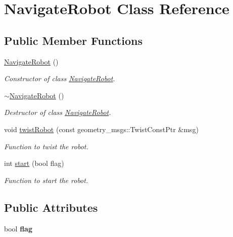 \hypertarget{class_navigate_robot}{}\section{Navigate\+Robot Class Reference}
\label{class_navigate_robot}
\subsection*{Public Member Functions}
\begin{DoxyCompactItemize}
\item 
\hyperlink{class_navigate_robot_ac27678ab7ff5b0416f661e899a50f9b4}{Navigate\+Robot} ()
\begin{DoxyCompactList}\small\item\em Constructor of class \hyperlink{class_navigate_robot}{Navigate\+Robot}. \end{DoxyCompactList}\item 
\hyperlink{class_navigate_robot_a004a6768d65abf86fba9e3fa586c54e6}{$\sim$\+Navigate\+Robot} ()
\begin{DoxyCompactList}\small\item\em Destructor of class \hyperlink{class_navigate_robot}{Navigate\+Robot}. \end{DoxyCompactList}\item 
void \hyperlink{class_navigate_robot_a1382b2a30d0dccfbe2e63132f3cbd880}{twist\+Robot} (const geometry\+\_\+msgs\+::\+Twist\+Const\+Ptr \&msg)
\begin{DoxyCompactList}\small\item\em Function to twist the robot. \end{DoxyCompactList}\item 
int \hyperlink{class_navigate_robot_ad02fc9f2481f002b7ad3b654a8ec80d2}{start} (bool flag)
\begin{DoxyCompactList}\small\item\em Function to start the robot. \end{DoxyCompactList}\end{DoxyCompactItemize}
\subsection*{Public Attributes}
\begin{DoxyCompactItemize}
\item 
\mbox{\label{class_navigate_robot_a6eadd58c6c56d73ff90e3d7ebd94bb3d}} 
bool {\bfseries flag}
\end{DoxyCompactItemize}


